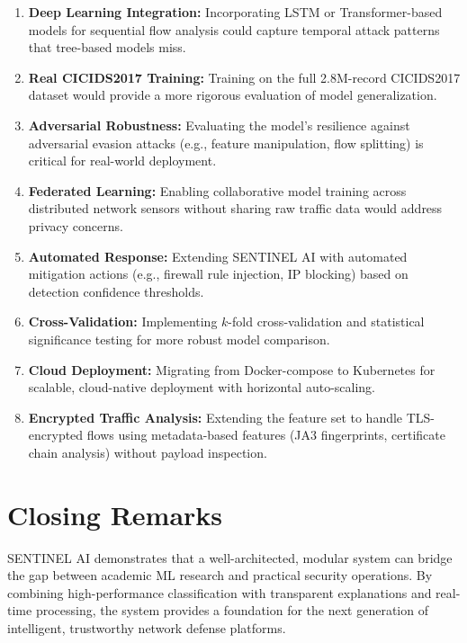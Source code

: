 \begin{enumerate}
    \item \textbf{Deep Learning Integration:} Incorporating LSTM or Transformer-based models for sequential flow analysis could capture temporal attack patterns that tree-based models miss.

    \item \textbf{Real CICIDS2017 Training:} Training on the full 2.8M-record CICIDS2017 dataset would provide a more rigorous evaluation of model generalization.

    \item \textbf{Adversarial Robustness:} Evaluating the model's resilience against adversarial evasion attacks (e.g., feature manipulation, flow splitting) is critical for real-world deployment.

    \item \textbf{Federated Learning:} Enabling collaborative model training across distributed network sensors without sharing raw traffic data would address privacy concerns.

    \item \textbf{Automated Response:} Extending SENTINEL AI with automated mitigation actions (e.g., firewall rule injection, IP blocking) based on detection confidence thresholds.

    \item \textbf{Cross-Validation:} Implementing $k$-fold cross-validation and statistical significance testing for more robust model comparison.

    \item \textbf{Cloud Deployment:} Migrating from Docker-compose to Kubernetes for scalable, cloud-native deployment with horizontal auto-scaling.

    \item \textbf{Encrypted Traffic Analysis:} Extending the feature set to handle TLS-encrypted flows using metadata-based features (JA3 fingerprints, certificate chain analysis) without payload inspection.
\end{enumerate}

\section{Closing Remarks}

SENTINEL AI demonstrates that a well-architected, modular system can bridge the gap between academic ML research and practical security operations. By combining high-performance classification with transparent explanations and real-time processing, the system provides a foundation for the next generation of intelligent, trustworthy network defense platforms.
